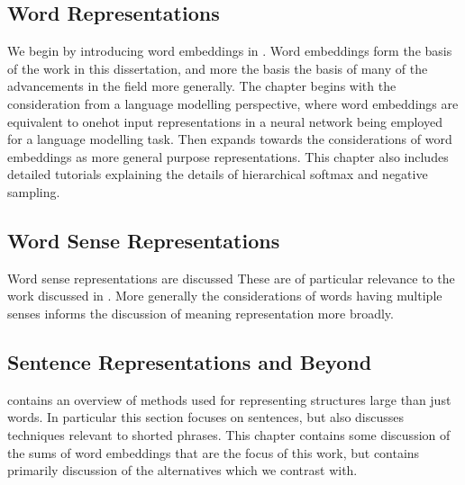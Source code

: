\documentclass{book}
\begin{document}
\subsection{ Word Representations}
We begin by introducing word embeddings in .
Word embeddings form the basis of the work in this dissertation, and more the basis the basis of many of the advancements in the field more generally.
The chapter begins with the consideration from a language modelling perspective,
where word embeddings are equivalent to onehot input representations in a neural network being employed for a language modelling task.
Then expands towards the considerations of word embeddings as more general purpose representations.
This chapter also includes detailed tutorials explaining the details of hierarchical softmax and negative sampling.


\subsection{ Word Sense Representations}
Word sense representations are discussed 
These are of particular relevance to the work discussed in .
More generally the considerations of words having multiple senses informs the discussion of meaning representation more broadly.

\subsection{ Sentence Representations and Beyond}
 contains an overview of methods used for representing structures large than just words.
In particular this section focuses on sentences, but also discusses techniques relevant to shorted phrases.
This chapter contains some discussion of the sums of word embeddings that are the focus of this work,
but contains primarily discussion of the alternatives which we contrast with.
\end{document}
